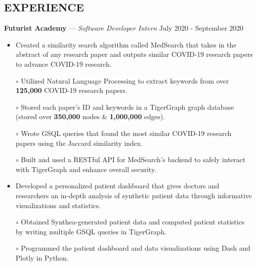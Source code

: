 \documentclass[11pt]{res}
\begin{document}
\begin{footnotesize}
\begin{resume}
\begin{small}
\section{EXPERIENCE}
\end{small}
\vspace{.5mm}
\textbf{Futurist Academy} — {\sl Software Developer Intern} \hfill July 2020 - September 2020\vspace{-5mm}
\begin{itemize}[leftmargin=6.25mm]
\item Created a similarity search algorithm called MedSearch that takes in the abstract of any research paper and outputs similar COVID-19 research papers to advance COVID-19 research.
\end{itemize}
\vspace{-6.4mm}
\begin{itemize} \itemsep -2pt 
\item[$\circ$] Utilized Natural Language Processing to extract keywords from over \textbf{125,000} COVID-19 research papers.
\vspace{1mm}
\item[$\circ$] Stored each paper's ID and keywords in a TigerGraph graph database (stored over \textbf{350,000} nodes \& \textbf{1,000,000} edges).
\vspace{1mm}
\item[$\circ$] Wrote GSQL queries that found the most similar COVID-19 research papers using the Jaccard similarity index.
\vspace{1mm}
\item[$\circ$] Built and used a RESTful API for MedSearch's backend to safely interact with TigerGraph and enhance overall security.
\end{itemize}
\vspace{-6mm}
\begin{itemize}[leftmargin=6.25mm]
\item Developed a personalized patient dashboard that gives doctors and researchers an in-depth analysis of synthetic patient data through informative visualizations and statistics.
\end{itemize}
\vspace{-6.95mm}
\begin{itemize} \itemsep -2pt 
\item[$\circ$] Obtained Synthea-generated patient data and computed patient statistics by writing multiple GSQL queries in TigerGraph.
\vspace{1mm}
\item[$\circ$] Programmed the patient dashboard and data visualizations using Dash and Plotly in Python.

\end{itemize}
\end{resume}
\end{footnotesize}
\end{document}
